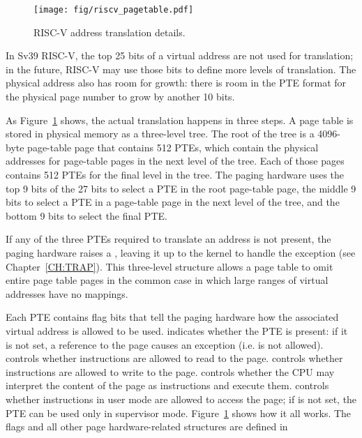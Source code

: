 \begin{figure}[t]
\center
\texttt{[image: fig/riscv\_pagetable.pdf]}
\caption{RISC-V address translation details.}
\label{fig:riscv_pagetable}
\end{figure}

In Sv39 RISC-V, the top 25 bits of a virtual address are not
used for translation; in the future, RISC-V may use those bits to
define more levels of translation.  The physical address also
has room for growth: there is room in the PTE format for the
physical page number to grow by another 10 bits.

As 
Figure~\ref{fig:riscv_pagetable} shows,
the actual translation happens in three steps.  A page table is stored
in physical memory as a three-level tree.
The root of the tree is a
4096-byte page-table page that contains 512 PTEs, which contain the physical
addresses for page-table pages in the next level of the tree.  Each of those
pages contains 512 PTEs for the final level in the tree.  The paging
hardware uses the top 9 bits of the 27 bits to select a PTE in the
root page-table page, the middle 9 bits to select a PTE in a page-table page in the
next level of the
tree, and the bottom 9 bits to select the final PTE.

If any of the three PTEs required to translate an address
is not present, the paging hardware raises a , leaving it up
to the kernel to handle the exception (see Chapter~\ref{CH:TRAP}).
This three-level structure allows a page table to omit entire page
table pages in the common case in which large ranges of virtual
addresses have no mappings.

Each PTE contains flag bits that tell the paging hardware
how the associated virtual address is allowed to be used.
indicates whether the PTE is present: if it is
not set, a reference to the page causes an exception (i.e. is not allowed).
controls whether instructions are allowed to 
read to the page.
controls whether instructions are allowed to 
write to the page.
controls whether the CPU may interpret the content
of the page as instructions and execute them.
controls whether instructions in user mode are allowed
to access the page;
if  is not set, the PTE can be used only in supervisor mode.
Figure~\ref{fig:riscv_pagetable}
shows how it all works.
The flags and all other page hardware-related structures are defined in

